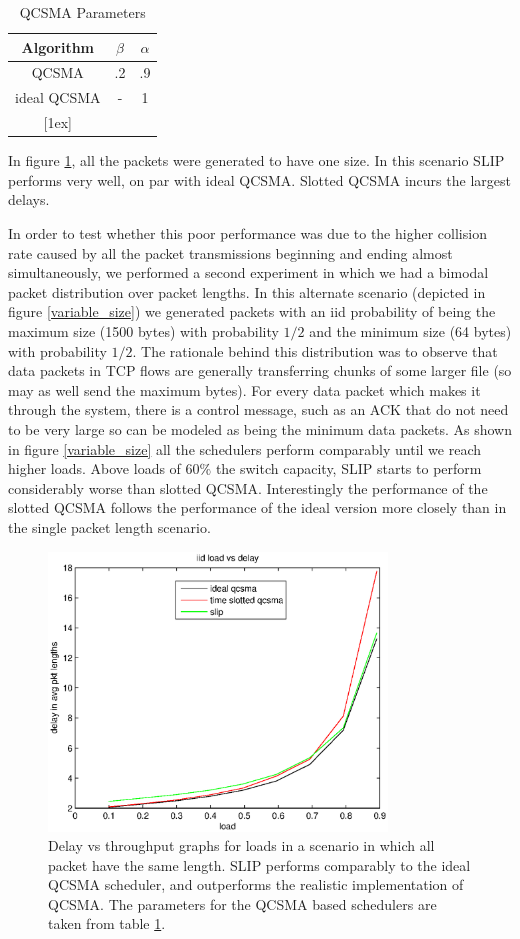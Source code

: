 \documentclass[11pt]{article}%
\begin{document}
\begin{table}[ht] \caption{QCSMA Parameters} 
\centering 
\begin{tabular}{c c c}
 \hline\hline 
 Algorithm & $\beta$ & $\alpha$ \\
  [0.5ex] \hline 
   QCSMA&.2&.9  \\
   ideal  QCSMA&-&1  \\
  [1ex] \hline 
  \end{tabular}
   \label{qcsma_parameters} 
\end{table}

In figure \ref{one_size}, all the packets were generated to have one size.  In this scenario SLIP performs very well, on par with ideal QCSMA.  Slotted QCSMA incurs the largest delays.

In order to test whether this poor performance was due to the higher collision rate caused by all the packet transmissions beginning and ending almost simultaneously, we performed a second experiment in which we had a bimodal packet distribution over packet lengths.  In this alternate scenario (depicted in figure \ref{variable_size}) we generated packets with an iid probability of being the maximum size (1500 bytes) with probability $1/2$ and the minimum size (64 bytes) with probability $1/2$.  The rationale behind this distribution was to observe that data packets in TCP flows are generally transferring chunks of some larger file (so may as well send the maximum bytes).  For every data packet which makes it through the system, there is a control message, such as an ACK that do not need to be very large so can be modeled as being the minimum data packets.  As shown in figure \ref{variable_size} all the schedulers perform comparably until we reach higher loads.  Above loads of $60\%$ the switch capacity, SLIP starts to perform considerably worse than slotted QCSMA.  Interestingly the performance of the slotted QCSMA follows the performance of the ideal version more closely than in the single packet length scenario.

\begin{figure}%
	 \includegraphics[width=90mm]{us_load.eps}
	\caption{Delay vs throughput graphs for loads in a scenario in which all packet have the same length.  SLIP performs comparably to the ideal QCSMA scheduler, and outperforms the realistic implementation of QCSMA.  The parameters for the QCSMA based schedulers are taken from table \ref{qcsma_parameters}.} 	
	\label{one_size}
\end{figure}
\end{document}
